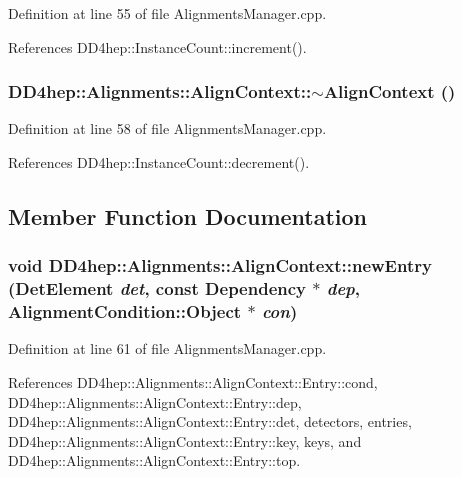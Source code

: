 Definition at line 55 of file AlignmentsManager.cpp.

References DD4hep::InstanceCount::increment().\hypertarget{class_d_d4hep_1_1_alignments_1_1_align_context_ab283a69726f22fa38ab82b93286c9ab9}{
\subsubsection[{$\sim$AlignContext}]{\setlength{\rightskip}{0pt plus 5cm}DD4hep::Alignments::AlignContext::$\sim$AlignContext ()}}
\label{class_d_d4hep_1_1_alignments_1_1_align_context_ab283a69726f22fa38ab82b93286c9ab9}


Definition at line 58 of file AlignmentsManager.cpp.

References DD4hep::InstanceCount::decrement().

\subsection{Member Function Documentation}
\hypertarget{class_d_d4hep_1_1_alignments_1_1_align_context_aff6f08db18fa6c1ff668371240ee438a}{
\subsubsection[{newEntry}]{\setlength{\rightskip}{0pt plus 5cm}void DD4hep::Alignments::AlignContext::newEntry ({\bf DetElement} {\em det}, \/  const {\bf Dependency} $\ast$ {\em dep}, \/  {\bf AlignmentCondition::Object} $\ast$ {\em con})}}
\label{class_d_d4hep_1_1_alignments_1_1_align_context_aff6f08db18fa6c1ff668371240ee438a}


Definition at line 61 of file AlignmentsManager.cpp.

References DD4hep::Alignments::AlignContext::Entry::cond, DD4hep::Alignments::AlignContext::Entry::dep, DD4hep::Alignments::AlignContext::Entry::det, detectors, entries, DD4hep::Alignments::AlignContext::Entry::key, keys, and DD4hep::Alignments::AlignContext::Entry::top.

